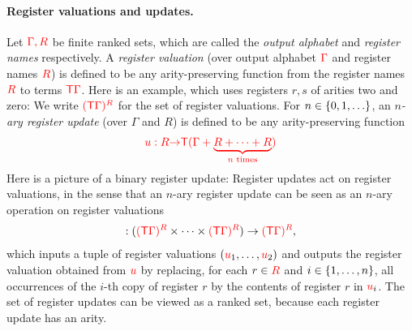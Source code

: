 \paragraph*{Register valuations and updates.}   Let ${\color{red}{\Gamma, R}}$ be finite ranked sets, which are called the \emph{output alphabet} and \emph{register names} respectively.  
A \emph{register valuation} (over output alphabet ${\color{red}{\Gamma}}$ and register names ${\color{red}{R}}$) is defined to be any arity-preserving function from the register names ${{\color{red}{R}}}$ to terms ${\color{red}{\mathsf T}} {\color{red}{\Gamma}}$. Here is an example, which uses registers $r,s$ of arities two and zero:
We write ${\color{red}{({\color{red}{\mathsf T}}{\color{red}{\Gamma}})^{{{\color{red}{R}}}}}}$ for the set of register valuations. For  $n \in \{0,1,\ldots\}$, an \emph{$n$-ary register update} (over $\Gamma$ and $R$) is defined to be any arity-preserving function
\begin{align}\label{eq:reg-operation}
    {\color{red}{u : {{\color{red}{R}}}{\color{red}{\to}}{\color{red}{\mathsf T}}( {\color{red}{\Gamma}}+ \underbrace{{{{\color{red}{R}}}+ \cdots + {{\color{red}{R}}}}}_{\text{$n$ times}})}}
\end{align}
Here is a picture of a binary register update:
Register updates act on register valuations, in the sense that an $n$-ary register update can be seen as an $n$-ary operation on  register valuations
\begin{align*}
    [\ranked u] : (\regvals \rGamma \regnames \times \cdots \times \regvals \rGamma \regnames) \to \regvals \rGamma \regnames,
\end{align*}
which inputs a tuple of register valuations $({\color{red}{u}}_1,\ldots,{\color{red}{u}}_2)$ and outputs the register valuation obtained from ${\color{red}{u}}$ by replacing, for each $r \in {{\color{red}{R}}}$ and $i \in \{1,\ldots,n\}$, all occurrences of the $i$-th copy of register $r$  by the contents of register $r$ in ${\color{red}{u}}_i$. The set of register updates can be viewed as a ranked set, because each register update has an arity. 


